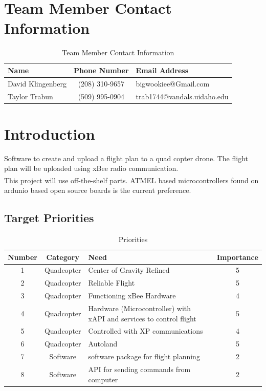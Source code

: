 \documentclass[pdftex,11pt]{article}
\begin{document}
\begin{titlepage}

\newpage
\thispagestyle{empty}
\mbox{}
\end{titlepage}

\tableofcontents
\listoffigures
\listoftables

\clearpage
{}
\setcounter{page}{1}
\section{Team Member Contact Information}
  \begin{table}[h]
		\begin{tabular}{| l | c | p{5cm} |}
		\hline
		Name & Phone Number & Email Address\\\hline
		David Klingenberg  &  (208) 310-9657 &  bigwookiee@Gmail.com\\
		Taylor Trabun & (509) 995-0904 & trab1744@vandals.uidaho.edu\\
		\hline
	\end{tabular}
\caption{Team Member Contact Information}
\label{table:1}
\end{table}


\section{Introduction}


Software to create and upload a flight plan to a quad copter drone. The flight plan will be uploaded using xBee radio communication.\\

This project will use off-the-shelf parts.  ATMEL\textsuperscript{\textcopyright} based microcontrollers found on ardunio based open source boards is the current preference.

\subsection{Target Priorities}

\begin{table}[h]
	\begin{tabular}{c | c | p{8cm} | c}
	\hline
		 Number & Category & Need & Importance \\ \hline
		 1 & Quadcopter & Center of Gravity Refined & 5 \\
		 2 & Quadcopter & Reliable Flight & 5 \\
		 3 & Quadcopter & Functioning xBee Hardware &  4 \\
		 4 & Quadcopter & Hardware (Microcontroller) with xAPI and services to control flight & 5 \\
		 5 & Quadcopter & Controlled with XP communications &  4 \\
	   6 & Quadcopter & Autoland & 5 \\
	   7 & Software & software package for flight planning & 2\\
	   8 & Software & API for sending commands from computer & 2\\
	\end{tabular}
	\caption{Priorities}
	\label{table:2}
\end{table}
\end{document}
